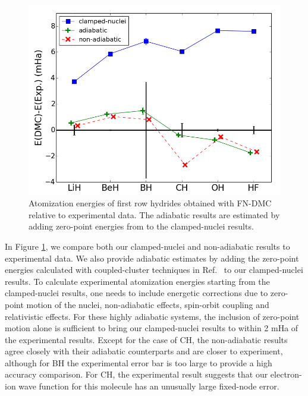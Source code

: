 \documentclass[pra,superscriptaddress,groupedaddress,twocolumn]{revtex4-1}
\begin{document}
\begin{figure}[h]
\centering
\includegraphics[scale=.4]{Figures/atomization}
\caption{Atomization energies of first row hydrides obtained with FN-DMC relative to experimental data. The adiabatic results are estimated by adding zero-point energies from \cite{Feller_Corrections} to the clamped-nuclei results. \label{fig:atomization}}
\end{figure}

In Figure \ref{fig:atomization}, we compare both our clamped-nuclei and non-adiabatic results to experimental data. We also provide adiabatic estimates by adding the zero-point energies calculated with coupled-cluster techniques in Ref.~\cite{Feller_Corrections} to our clamped-nuclei results. To calculate experimental atomization energies starting from the clamped-nuclei results, one needs to include energetic corrections due to zero-point motion of the nuclei, non-adiabatic effects, spin-orbit coupling and relativistic effects. For these highly adiabatic systems, the inclusion of zero-point motion alone is sufficient to bring our clamped-nuclei results to within 2 mHa of the experimental results. Except for the case of CH, the non-adiabatic results agree closely with their adiabatic counterparts and are closer to experiment, although for BH the experimental error bar is too large to provide a high accuracy comparison. For CH, the experimental result suggests that our electron-ion wave function for this molecule has an unusually large fixed-node error.
\end{document}
